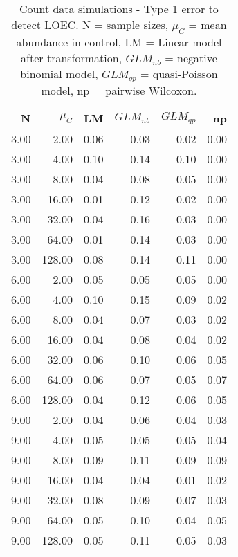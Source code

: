 \begin{table}[H]
\centering
\caption{Count data simulations - Type 1 error to detect LOEC. N = sample sizes, 
             $\mu_C$ = mean abundance in control, LM = Linear model after transformation, 
             $GLM_{nb}$ = negative binomial model, $GLM_{qp}$ = quasi-Poisson model, 
            np = pairwise Wilcoxon.} 
\label{tab:t1_loec_c}
{\footnotesize
\begin{tabular}{rrrrrr}
  \hline
N & $\mu_C$ & LM & $GLM_{nb}$ & $GLM_{qp}$ & np \\ 
  \hline
3.00 & 2.00 & 0.06 & 0.03 & 0.02 & 0.00 \\ 
  3.00 & 4.00 & 0.10 & 0.14 & 0.10 & 0.00 \\ 
  3.00 & 8.00 & 0.04 & 0.08 & 0.05 & 0.00 \\ 
  3.00 & 16.00 & 0.01 & 0.12 & 0.02 & 0.00 \\ 
  3.00 & 32.00 & 0.04 & 0.16 & 0.03 & 0.00 \\ 
  3.00 & 64.00 & 0.01 & 0.14 & 0.03 & 0.00 \\ 
  3.00 & 128.00 & 0.08 & 0.14 & 0.11 & 0.00 \\ 
  6.00 & 2.00 & 0.05 & 0.05 & 0.05 & 0.00 \\ 
  6.00 & 4.00 & 0.10 & 0.15 & 0.09 & 0.02 \\ 
  6.00 & 8.00 & 0.04 & 0.07 & 0.03 & 0.02 \\ 
  6.00 & 16.00 & 0.04 & 0.08 & 0.04 & 0.02 \\ 
  6.00 & 32.00 & 0.06 & 0.10 & 0.06 & 0.05 \\ 
  6.00 & 64.00 & 0.06 & 0.07 & 0.05 & 0.07 \\ 
  6.00 & 128.00 & 0.04 & 0.12 & 0.06 & 0.05 \\ 
  9.00 & 2.00 & 0.04 & 0.06 & 0.04 & 0.03 \\ 
  9.00 & 4.00 & 0.05 & 0.05 & 0.05 & 0.04 \\ 
  9.00 & 8.00 & 0.09 & 0.11 & 0.09 & 0.09 \\ 
  9.00 & 16.00 & 0.04 & 0.04 & 0.01 & 0.02 \\ 
  9.00 & 32.00 & 0.08 & 0.09 & 0.07 & 0.03 \\ 
  9.00 & 64.00 & 0.05 & 0.10 & 0.04 & 0.05 \\ 
  9.00 & 128.00 & 0.05 & 0.11 & 0.05 & 0.03 \\ 
   \hline
\end{tabular}
}
\end{table}
